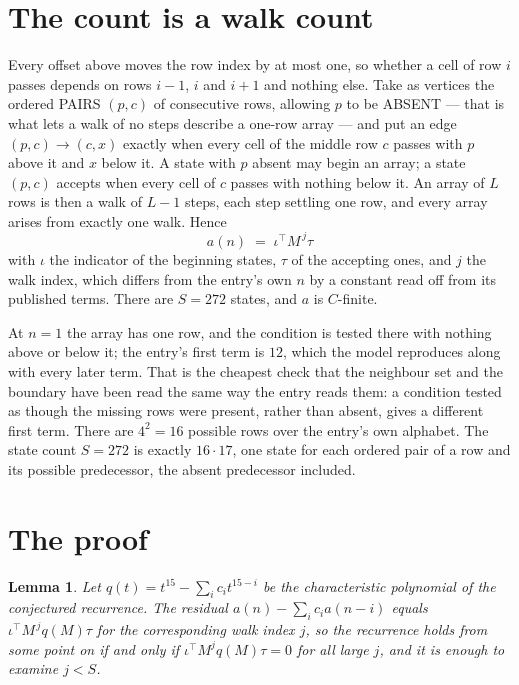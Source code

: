 \documentclass[11pt,a4paper]{article}
\theoremstyle{plain}
\newtheorem{lemma}[theorem]{Lemma}
\theoremstyle{definition}
\begin{document}
\section{The count is a walk count}

Every offset above moves the row index by at most one, so whether a cell of row $i$ passes
depends on rows $i-1$, $i$ and $i+1$ and nothing else. Take as vertices the ordered PAIRS
$(p,c)$ of consecutive rows, allowing $p$ to be ABSENT --- that is what lets a walk of no steps
describe a one-row array --- and put an edge $(p,c)\to(c,x)$ exactly when every cell of the
middle row $c$ passes with $p$ above it and $x$ below it. A state with $p$ absent may begin an
array; a state $(p,c)$ accepts when every cell of $c$ passes with nothing below it. An array of
$L$ rows is then a walk of $L-1$ steps, each step settling one row, and every array arises from
exactly one walk. Hence
\[
a(n)\;=\;\iota^{\!\top}M^{\,j}\tau
\]
with $\iota$ the indicator of the beginning states, $\tau$ of the accepting ones, and $j$ the
walk index, which differs from the entry's own $n$ by a constant read off from its published
terms. There are $S=272$ states, and $a$ is $C$-finite.

At $n=1$ the array has one row, and
the condition is tested there with nothing above or below it; the entry's first term is
$12$, which the model reproduces along with every later term. That is the cheapest check
that the neighbour set and the boundary have been read the same way the entry reads them: a
condition tested as though the missing rows were present, rather than absent, gives a different
first term. There are $4^{2}=16$ possible rows over the entry's own alphabet. The state count $S=272$ is exactly $16\cdot17$,
one state for each ordered pair of a row and its possible predecessor, the absent predecessor
included.

\section{The proof}

\begin{lemma}\label{lem:crit}
Let $q(t)=t^{15}-\sum_i c_it^{15-i}$ be the characteristic polynomial of the
conjectured recurrence. The residual $a(n)-\sum_ic_ia(n-i)$ equals
$\iota^{\!\top}M^{\,j}q(M)\tau$ for the corresponding walk index $j$, so the recurrence
holds from some point on if and only if $\iota^{\!\top}M^{j}q(M)\tau=0$ for all large $j$,
and it is enough to examine $j<S$.
\end{lemma}
\end{document}
